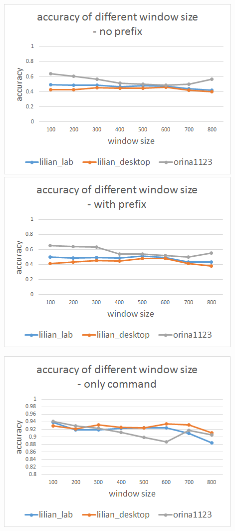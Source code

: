 \documentclass[11pt,a4paper]{article}
\begin{document}
\begin{center}
\includegraphics[scale=0.55]{line1.png}
\includegraphics[scale=0.55]{line2.png}
\end{center}
\begin{center}
\includegraphics[scale=0.55]{line3.png}
\end{center}
\end{document}
